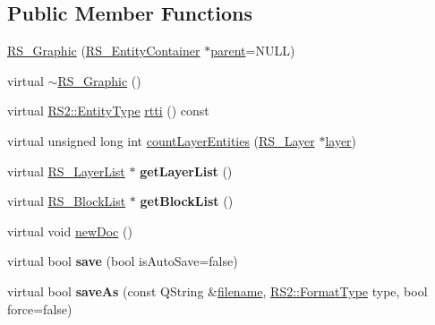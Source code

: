 \subsection*{Public Member Functions}
\begin{DoxyCompactItemize}
\item 
\hyperlink{classRS__Graphic_ae0eebc0350b847e78f8102701cf0d015}{R\-S\-\_\-\-Graphic} (\hyperlink{classRS__EntityContainer}{R\-S\-\_\-\-Entity\-Container} $\ast$\hyperlink{classRS__Entity_a80358a8d2fc6739a516a278dc500b49f}{parent}=N\-U\-L\-L)
\item 
virtual \hyperlink{classRS__Graphic_a51ee2b4f30871713b9a90d11954076b3}{$\sim$\-R\-S\-\_\-\-Graphic} ()
\item 
virtual \hyperlink{classRS2_a8f26d1b981e1e85cff16738b43337e6a}{R\-S2\-::\-Entity\-Type} \hyperlink{classRS__Graphic_a008220bc48d47c80b5286587b4ba808c}{rtti} () const 
\item 
virtual unsigned long int \hyperlink{classRS__Graphic_a853c7e684fc4518a1e699fecc1e40e42}{count\-Layer\-Entities} (\hyperlink{classRS__Layer}{R\-S\-\_\-\-Layer} $\ast$\hyperlink{classRS__Entity_a6e738a0a081f97b9923787777e639b27}{layer})
\item 
\hypertarget{classRS__Graphic_a684469bfb26e6f819595021b2ce96ffc}{virtual \hyperlink{classRS__LayerList}{R\-S\-\_\-\-Layer\-List} $\ast$ {\bfseries get\-Layer\-List} ()}\label{classRS__Graphic_a684469bfb26e6f819595021b2ce96ffc}

\item 
\hypertarget{classRS__Graphic_abf306446e00b85f1a2b3f29021aeae02}{virtual \hyperlink{classRS__BlockList}{R\-S\-\_\-\-Block\-List} $\ast$ {\bfseries get\-Block\-List} ()}\label{classRS__Graphic_abf306446e00b85f1a2b3f29021aeae02}

\item 
virtual void \hyperlink{classRS__Graphic_aa6f20491fdfd58917c43534205e1ed57}{new\-Doc} ()
\item 
\hypertarget{classRS__Graphic_a300b86eabb80b891875b5aeb730f4c34}{virtual bool {\bfseries save} (bool is\-Auto\-Save=false)}\label{classRS__Graphic_a300b86eabb80b891875b5aeb730f4c34}

\item 
\hypertarget{classRS__Graphic_a98311ef7d9254f3098135cb2d46994b0}{virtual bool {\bfseries save\-As} (const Q\-String \&\hyperlink{classRS__Document_aefd3d25d96ec31943bdfd1453031a423}{filename}, \hyperlink{classRS2_a077a6c94c9a0ab9962c4d4a612c7189b}{R\-S2\-::\-Format\-Type} type, bool force=false)}\label{classRS__Graphic_a98311ef7d9254f3098135cb2d46994b0}


\end{DoxyCompactItemize}
